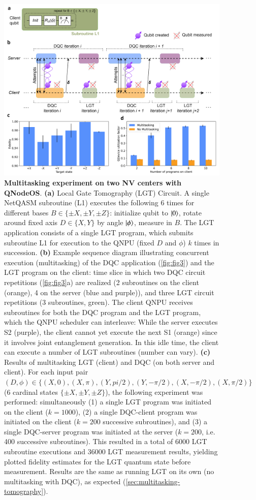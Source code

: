 \begin{figure}[htbp]
\centering
\includegraphics[width=0.95\linewidth]{figures/qnodeos/main/fig4/fig4.png}
\caption{\textbf{Multitasking experiment on two NV centers with QNodeOS}.
\textbf{(a)} Local Gate Tomography (LGT) Circuit. A single NetQASM subroutine (L1) executes the following 6 times for different bases $B \in \{\pm X, \pm Y, \pm Z\}$: initialize qubit to $\ket{0}$, rotate around fixed axis $D \in \{X,Y\}$ by angle $\ket{\phi}$, measure in $B$. The LGT application consists of a single LGT program, which submits subroutine L1 for execution to the QNPU (fixed $D$ and $\phi$) $k$ times in succession.
\textbf{(b)} Example sequence diagram illustrating concurrent execution (multitasking) of the DQC application (\cref{fig:fig3}) and the LGT program on the client: time slice in which two DQC circuit repetitions (\cref{fig:fig3}a) are realized (2 subroutines on the client (orange), 4 on the server (blue and purple)), and three LGT circuit repetitions (3 subroutines, green). The client QNPU receives subroutines for both the DQC program and the LGT program, which the QNPU scheduler can interleave: While the server executes S2 (purple), the client cannot yet execute the next S1 (orange) since it involves joint entanglement generation. In this idle time, the client can execute a number of LGT subroutines (number can vary).
\textbf{(c)} Results of multitasking LGT (client) and DQC (on both server and client). For each input pair $(D, \phi) \in \{ (X,0), (X,\pi), (Y,pi/2), (Y,-\pi/2), (X,-\pi/2), (X,\pi/2) \}$ (6 cardinal states $\{\pm X, \pm Y, \pm Z\}$), the following experiment was performed: simultaneously (1) a single LGT program was initiated on the client ($k=1000$), (2) a single DQC-client program was initiated on the client ($k=200$ successive subroutines), and (3) a single DQC-server program was initiated at the server ($k=200$, i.e. 400 successive subroutines). This resulted in a total of 6000 LGT subroutine executions and 36000 LGT measurement results, yielding plotted fidelity estimates for the LGT quantum state before measurement. Results are the same as running LGT on its own (no multitasking with DQC), as expected (\cref{sec:multitasking-tomography}).
}
\end{figure}
